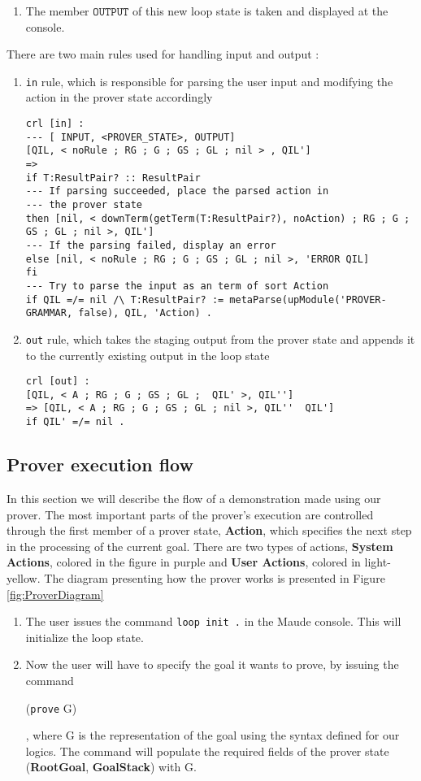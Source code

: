 \documentclass[12pt,a4paper]{article}
\begin{document}
{\begin{enumerate}
	This is the step where all the logic of the prover goes into, in the form of rewriting rules which modify the prover state.
	\item The member \(\mathtt{OUTPUT}\) of this new loop state is taken and displayed at the console.
\end{enumerate}
There are two main rules used for handling input and output : 
\begin{enumerate}
	\item{\texttt{in} rule, which is responsible for parsing the user input and modifying the action in the prover state accordingly}
	\begin{lstlisting}[caption=in rule]
crl [in] : 
--- [ INPUT, <PROVER_STATE>, OUTPUT]
[QIL, < noRule ; RG ; G ; GS ; GL ; nil > , QIL']
=> 
if T:ResultPair? :: ResultPair  
--- If parsing succeeded, place the parsed action in
--- the prover state
then [nil, < downTerm(getTerm(T:ResultPair?), noAction) ; RG ; G ; GS ; GL ; nil >, QIL']  
--- If the parsing failed, display an error
else [nil, < noRule ; RG ; G ; GS ; GL ; nil >, 'ERROR QIL]  
fi  
--- Try to parse the input as an term of sort Action
if QIL =/= nil /\ T:ResultPair? := metaParse(upModule('PROVER-GRAMMAR, false), QIL, 'Action) .
\end{lstlisting}
	\item{\texttt{out} rule, which takes the staging output from the prover state and appends it to the currently existing output in the loop state}
	\begin{lstlisting}[caption=out rule]
crl [out] :
[QIL, < A ; RG ; G ; GS ; GL ;  QIL' >, QIL'']
=> [QIL, < A ; RG ; G ; GS ; GL ; nil >, QIL''  QIL']
if QIL' =/= nil .
\end{lstlisting}
\end{enumerate}

\subsection{Prover execution flow}
In this section we will describe the flow of a demonstration made using our prover. The most important parts of the prover's execution are controlled through the first member of a prover state, \textbf{Action}, which specifies the next step in the processing of the current goal. There are two types of actions, \textbf{System Actions}, colored in the figure in purple and \textbf{User Actions}, colored in light-yellow. The diagram presenting how the prover works is presented in Figure \ref{fig:ProverDiagram}
\\
\begin{enumerate}
	\item The user issues the command \texttt{loop init .} in the Maude console. This will initialize the loop state.
	\item Now the user will have to specify the goal it wants to prove, by issuing the command \begin{center}(\texttt{prove} G)\end{center}, where G is the representation of the goal using the syntax defined for our logics. The command will populate the required fields of the prover state (\textbf{RootGoal}, \textbf{GoalStack}) with G.
	\\
	

\end{enumerate}}
\end{document}
